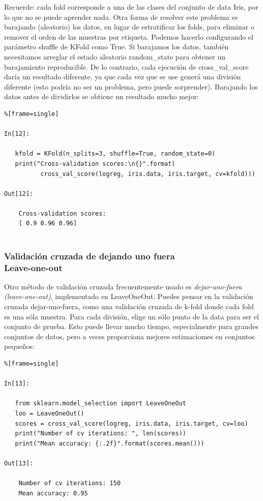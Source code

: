 Recuerde: cada  fold   corresponde a una de las clases del conjunto de data Iris, por lo que no se puede aprender nada. Otra forma de resolver este problema es barajando (aleatorio) los datos, en lugar de estratificar los folds, para eliminar o remover el orden de las muestras por etiqueta. Podemos hacerlo configurando el parámetro {\ttfamily shuffle} de {\ttfamily  KFold} como {\ttfamily True}. Si barajamos los datos, también necesitamos arreglar el estado aleatorio {\ttfamily random\_state} para obtener un barajamiento reproducible. De lo contrario, cada ejecución de {\ttfamily cross\_val\_score} daría un resultado diferente, ya que cada vez que  se use generá una división diferente (esto podría no ser un problema, pero puede  sorprender). Barajando los datos antes de dividirlos se obtiene un resultado mucho mejor:

\begin{lstlisting}%[frame=single]

In[12]:
   
   kfold = KFold(n_splits=3, shuffle=True, random_state=0)
   print("Cross-validation scores:\n{}".format(
          cross_val_score(logreg, iris.data, iris.target, cv=kfold)))
   
Out[12]:

    Cross-validation scores:
    [ 0.9 0.96 0.96]
    
\end{lstlisting}


\subsubsection{Validación cruzada de dejando uno fuera	\\ Leave-one-out} 


Otro método de validación cruzada frecuentemente usado es {\emph{dejar-uno-fuera (leave-one-out)}}, implementado en {\ttfamily LeaveOneOut}. Puedes pensar en la validación cruzada dejar-uno-fuera,  como una validación cruzada de k-fold donde cada fold  es una sóla muestra. Para cada división,  elige un sólo punto de la data para ser el conjunto de prueba. Esto puede llevar mucho tiempo, especialmente para grandes conjuntos de datos, pero a veces proporciona mejores estimaciomes en conjuntos pequeños:


\begin{lstlisting}%[frame=single]

In[13]:

   from sklearn.model_selection import LeaveOneOut
   loo = LeaveOneOut()
   scores = cross_val_score(logreg, iris.data, iris.target, cv=loo)
   print("Number of cv iterations: ", len(scores))
   print("Mean accuracy: {:.2f}".format(scores.mean()))

Out[13]:

    Number of cv iterations: 150
    Mean accuracy: 0.95

\end{lstlisting}



